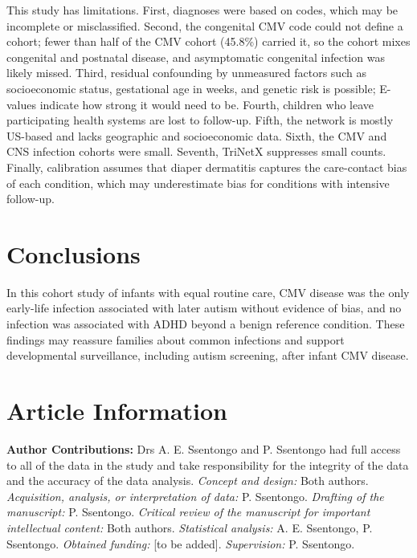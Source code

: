 \documentclass[11pt]{article}
\begin{document}
This study has limitations. First, diagnoses were based on codes, which may be incomplete or misclassified. Second, the congenital CMV code could not define a cohort; fewer than half of the CMV cohort
(45.8\%) carried it, so the cohort mixes congenital and postnatal disease, and asymptomatic congenital infection was likely missed. Third, residual confounding by unmeasured factors such as
socioeconomic status, gestational age in weeks, and genetic risk is possible; E-values indicate how strong it would need to be. Fourth, children who leave participating health systems are lost to
follow-up. Fifth, the network is mostly US-based and lacks geographic and socioeconomic data. Sixth, the CMV and CNS infection cohorts were small. Seventh, TriNetX suppresses small counts. Finally,
calibration assumes that diaper dermatitis captures the care-contact bias of each condition, which may underestimate bias for conditions with intensive follow-up.

\hypertarget{conclusions}{%
\section*{Conclusions}\label{conclusions}}

In this cohort study of infants with equal routine care, CMV disease was the only early-life infection associated with later autism without evidence of bias, and no infection was associated with ADHD
beyond a benign reference condition. These findings may reassure families about common infections and support developmental surveillance, including autism screening, after infant CMV disease.

\newpage

\hypertarget{article-information}{%
\section*{Article Information}\label{article-information}}

\textbf{Author Contributions:} Drs A. E. Ssentongo and P. Ssentongo had full access to all of the data in the study and take responsibility for the integrity of the data and the accuracy of the data
analysis. \emph{Concept and design:} Both authors. \emph{Acquisition, analysis, or interpretation of data:} P. Ssentongo. \emph{Drafting of the manuscript:} P. Ssentongo. \emph{Critical review of the
manuscript for important intellectual content:} Both authors. \emph{Statistical analysis:} A. E. Ssentongo, P. Ssentongo. \emph{Obtained funding:} {[}to be added{]}. \emph{Supervision:} P. Ssentongo.
\end{document}
